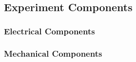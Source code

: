 \begin{landscape}
\subsection{Experiment Components}
\subsubsection{Electrical Components}




\end{landscape}

\begin{landscape}
\subsubsection{Mechanical Components}





\end{landscape}

\raggedbottom